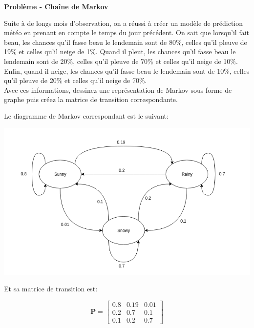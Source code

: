 \begin{Exercice}[10 minutes]\textbf{Problème - Chaîne de Markov}

Suite à  de longs mois d’observation, on a réussi à créer un modèle de prédiction météo en prenant en compte le temps du jour précédent. On sait que lorsqu’il fait beau, les chances qu’il fasse beau le lendemain sont de 80\%, celles qu’il pleuve de 19\% et celles qu’il neige de 1\%. Quand il pleut, les chances qu’il fasse beau le lendemain sont de 20\%, celles qu’il pleuve de 70\% et celles qu’il neige de 10\%. Enfin, quand il neige, les chances qu’il fasse beau le lendemain sont de 10\%, celles qu’il pleuve de 20\% et celles qu’il neige de 70\%.\\
Avec ces informations, dessinez une représentation de Markov sous forme de graphe puis créez la matrice de transition correspondante.


    \begin{solution}
        Le diagramme de Markov correspondant est le suivant:

	    \centering
	    \includegraphics[width=.7\textwidth]{solutions/Etats_markov.png}
	
	Et sa matrice de transition est:

	\[ 
		\mathbf{P} =
		\begin{bmatrix}
		0.8 & 0.19 & 0.01 \\
		0.2 & 0.7 & 0.1 \\
		0.1 & 0.2 & 0.7
		\end{bmatrix}
	\]
	
    \end{solution}


\end{Exercice}

